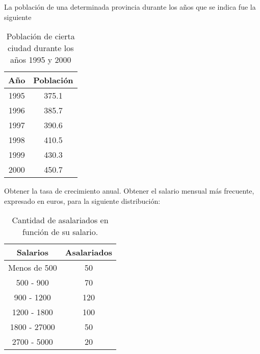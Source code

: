 \documentclass{exam}
\begin{document}
	\begin{questions}
		\question La población de una determinada provincia durante los años que se indica fue la siguiente
		\begin{table}[H]
			\centering
			\begin{tabular}{|c|c|}
			\hline
			Año & Población\\
			\hline
			1995 & 375.1\\
			\hline
			1996 & 385.7\\
			\hline
			1997 & 390.6\\
			\hline
			1998 & 410.5\\
			\hline
			1999 & 430.3\\
			\hline
			2000 & 450.7\\
			\hline
			\end{tabular}
		\caption{Población de cierta ciudad durante los años 1995 y 2000}
		\end{table}
	Obtener la tasa de crecimiento anual.
	\question Obtener el salario mensual más frecuente, expresado en euros, para la siguiente distribución:
	\begin{table}[H]
		\centering
		\begin{tabular}{|c|c|}
			\hline
			Salarios & Asalariados\\
			\hline
			Menos de 500 & 50\\
			\hline
			500 - 900 & 70\\
			\hline
			900 - 1200 & 120\\
			\hline
			1200 - 1800 & 100\\
			\hline
			1800 - 27000 & 50\\
			\hline
			2700 - 5000 & 20\\
			\hline
		\end{tabular}
	\caption{Cantidad de asalariados en función de su salario.}
	\end{table}
\end{questions}
\end{document}

